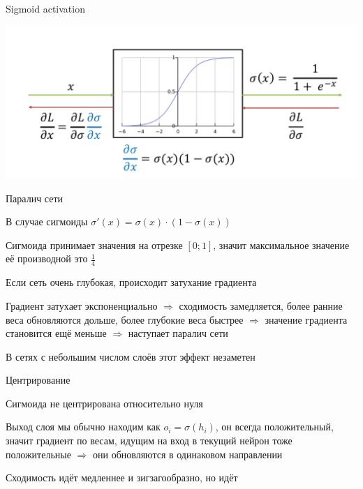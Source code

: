 \documentclass[notes,12pt, aspectratio=169]{beamer}
\newenvironment{wideitemize}{\itemize\addtolength{\itemsep}{10pt}}{\enditemize}
\begin{document}
\begin{frame}{Sigmoid activation}
\begin{center}
\includegraphics[width=.8\linewidth]{sigmoid_activation_2.png}
\end{center}
\end{frame}


\begin{frame}{Паралич сети}
	\begin{wideitemize}
		\item  В случае сигмоиды $\sigma'(x) = \sigma(x) \cdot (1 - \sigma(x))$ 
		
		\item Сигмоида принимает значения на отрезке $[0; 1]$, значит максимальное значение её производной это $\frac{1}{4}$
		
		\item Если сеть очень глубокая, происходит \alert{затухание градиента} 
		
		\item Градиент затухает экспоненциально $\Rightarrow$ сходимость замедляется, более ранние веса обновляются дольше, более глубокие веса быстрее  $\Rightarrow$ значение градиента становится ещё меньше $\Rightarrow$ наступает \alert{паралич сети} 
		
		\item В сетях с небольшим числом слоёв этот эффект незаметен
	\end{wideitemize} 
\end{frame}


\begin{frame}{Центрирование}
\begin{wideitemize}
	\item  Сигмоида не центрирована относительно нуля 
	
	\item  Выход слоя мы обычно находим как $o_i = \sigma(h_i)$, он всегда положительный, значит градиент по весам, идущим на вход в текущий нейрон тоже положительные $\Rightarrow$ они обновляются в одинаковом направлении 
	
	\item Сходимость идёт медленнее и зигзагообразно, но идёт 
	
\end{wideitemize} 
\end{frame}
\end{document}
